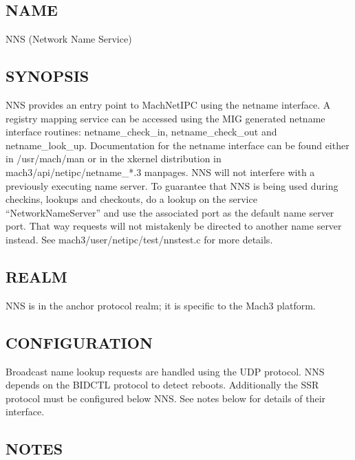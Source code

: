 %
%
%
%
%
%

\subsection*{NAME}

\noindent NNS (Network Name Service)


\subsection*{SYNOPSIS}

NNS provides an entry point to MachNetIPC using the netname
interface. A registry mapping service can be 
accessed using the MIG generated netname interface routines: 
netname\_check\_in, netname\_check\_out and netname\_look\_up.
Documentation for the netname interface can be found either in
/usr/mach/man or in the xkernel distribution in 
{\sanss mach3/api/netipc/netname\_*.3}
manpages. NNS will not interfere with a previously executing name
server. To guarantee that NNS is being used during checkins, 
lookups and checkouts, do a lookup on the service ``NetworkNameServer''
and use the associated port as the default name server port. That way
requests will not mistakenly be directed to another name server instead.
See mach3/user/netipc/test/nnstest.c for more details.

\subsection*{REALM}

NNS is in the anchor protocol realm; it is specific to the Mach3 platform.

\subsection*{CONFIGURATION}

Broadcast name lookup requests are handled using the UDP protocol.
NNS depends on the BIDCTL protocol to detect reboots. Additionally the SSR
protocol must be configured below NNS. See notes below for details of their 
interface.


\subsection*{NOTES}

